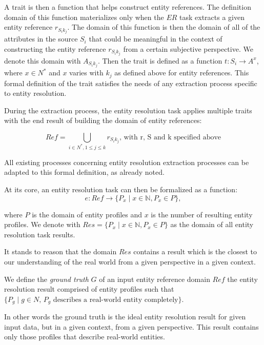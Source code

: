 \documentclass[11pt]{article}
\begin{document}
    A trait is then a function that helps construct entity references.
    The definition domain of this function materializes only when the $ER$ task
    extracts a given entity reference $r_{{S_i}{k_j}}$.
    The domain of this function is then the domain of all of the attributes in
    the source $S_i$ that could be meaningful in the context of constructing the
    entity reference $r_{{S_i}{k_j}}$ from a certain subjective perspective.
    We denote this domain with $A_{{S_i}{k_j}}$.
    Then the trait is defined as a function $t: S_i \rightarrow A^x$, where
    $x \in N^*$ and $x$ varies with $k_j$ as defined above for entity
    references.
    This formal definition of the trait satisfies the needs of any extraction
    process specific to entity resolution.

    During the extraction process, the entity resolution task applies multiple
    traits with the end result of building the domain of entity references:

    \[
        Ref = \bigcup_{i \in N^*,1 \leq j \leq k} r_{{S_i}{k_j}}
        \textrm{, with r, S and k specified above}
    \]

    All existing processes concerning entity resolution extraction processes can
    be adapted to this formal definition, as already noted\cite{Pap19}.
    
    At its core, an entity resolution task can then be formalized as a function:
    \[
        e : Ref \rightarrow \{P_x \mid x \in \mathbb{N}, P_x \in P \},
    \]
    
    where $P$ is the domain of entity profiles and $x$ is the number of
    resulting entity profiles.
    We denote with $Res=\{P_x \mid x \in \mathbb{N}, P_x \in P\}$ as the domain
    of all entity resolution task results.

    It stands to reason that the domain $Res$ contains a result which is the
    closest to our understanding of the real world from a given perspective in
    a given context.

    \begin{defn}
        We define the \textit{ground truth} $G$ of an input entity reference
        domain $Ref$ the entity resolution result comprised of entity profiles
        such that
        $\{P_g \mid g \in N\textrm{, $P_g$ describes a real-world entity
        completely}\}$.
    \end{defn}

    In other words the ground truth is the ideal entity resolution result for 
    given input data, but in a given context, from a given perspective.
    This result contains only those profiles that describe real-world entities.
\end{document}
